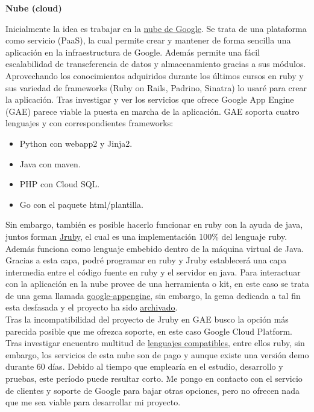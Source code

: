 \vspace*{0.3in}
\begin{LARGE}
	\textbf{{\huge Nube (cloud)}}
\end{LARGE}

\vspace*{0.1in}
Inicialmente la idea es trabajar en la \href{https://cloud.google.com/appengine/docs}{nube de Google}. Se trata de una plataforma como servicio (PaaS), la cual permite crear y mantener de forma sencilla una aplicación en la infraestructura de Google. Además permite una fácil escalabilidad de transeferencia de datos y almacenamiento gracias a sus módulos.\\

Aprovechando los conocimientos adquiridos durante los últimos cursos en ruby y sus variedad de frameworks (Ruby on Rails, Padrino, Sinatra) lo usaré para crear la aplicación. Tras investigar y ver los servicios que ofrece Google App Engine (GAE) parece viable la puesta en marcha de la aplicación. GAE soporta cuatro lenguajes y con correspondientes frameworks:
\begin{itemize}
	\item Python con webapp2 y Jinja2.
	\item Java con maven.
	\item PHP con Cloud SQL.
	\item Go con el paquete html/plantilla. 
\end{itemize}
Sin embargo, también es posible hacerlo funcionar en ruby con la ayuda de java, juntos forman \href{http://jruby.org/}{Jruby}, el cual es una implementación 100\% del lenguaje ruby. Además funciona como lenguaje embebido dentro de la máquina virtual de Java. Gracias a esta capa, podré programar en ruby y Jruby establecerá una capa intermedia entre el código fuente en ruby y el servidor en java. Para interactuar con la aplicación en la nube provee de una herramienta o kit, en este caso se trata de una gema llamada \href{https://rubygems.org/gems/google-appengine}{google-appengine}, sin embargo, la gema
dedicada a tal fin esta desfasada y el proyecto ha sido \href{https://code.google.com/p/appengine-jruby/}{archivado}.\\

Tras la incompatibilidad del proyecto de Jruby en GAE busco la opción más parecida posible que me ofrezca soporte, en este caso Google Cloud Platform. Tras investigar encuentro multitud de \href{https://cloud.google.com/launcher/explore}{lenguajes compatibles}, entre ellos ruby, sin embargo, los servicios de esta nube son de pago y aunque existe una versión demo durante 60 días. Debido al tiempo que emplearía en el estudio, desarrollo y pruebas, este período puede resultar corto. Me pongo en contacto con el servicio de clientes y soporte de Google para bajar otras opciones, pero no ofrecen nada que me sea viable para desarrollar mi proyecto.\\

